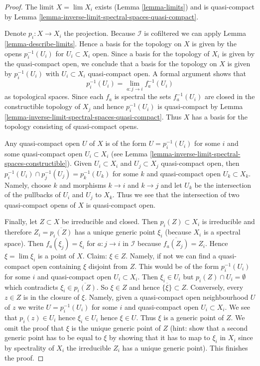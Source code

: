 \begin{proof}
The limit $X = \lim X_i$ exists (Lemma \ref{lemma-limits})
and is quasi-compact by
Lemma \ref{lemma-inverse-limit-spectral-spaces-quasi-compact}.

\medskip\noindent
Denote $p_i : X \to X_i$ the projection.
Because $\mathcal{I}$ is cofiltered we can apply
Lemma \ref{lemma-describe-limits}.
Hence a basis for the topology on $X$ is given by the opens
$p_i^{-1}(U_i)$ for $U_i \subset X_i$ open. Since a basis for
the topology of $X_i$ is given by the quasi-compact open, we conclude
that a basis for the topology on $X$ is given by $p_i^{-1}(U_i)$
with $U_i \subset X_i$ quasi-compact open. A formal argument
shows that
$$
p_i^{-1}(U_i) = \lim_{a : j \to i} f_a^{-1}(U_i)
$$
as topological spaces. Since each $f_a$ is spectral the sets
$f_a^{-1}(U_i)$ are closed in the constructible topology of $X_j$
and hence $p_i^{-1}(U_i)$ is quasi-compact
by Lemma \ref{lemma-inverse-limit-spectral-spaces-quasi-compact}.
Thus $X$ has a basis for the topology consisting of quasi-compact opens.

\medskip\noindent
Any quasi-compact open $U$ of $X$ is of the form $U = p_i^{-1}(U_i)$
for some $i$ and some quasi-compact open $U_i \subset X_i$
(see Lemma \ref{lemma-inverse-limit-spectral-spaces-constructible}).
Given $U_i \subset X_i$ and $U_j \subset X_j$ quasi-compact open, then
$p_i^{-1}(U_i) \cap p_j^{-1}(U_j) = p_k^{-1}(U_k)$ for some $k$
and quasi-compact open $U_k \subset X_k$. Namely, choose $k$
and morphisms $k \to i$ and $k \to j$ and let $U_k$ be the intersection of the
pullbacks of $U_i$ and $U_j$ to $X_k$. Thus we see that the intersection
of two quasi-compact opens of $X$ is quasi-compact open.

\medskip\noindent
Finally, let $Z \subset X$ be irreducible and closed. Then $p_i(Z) \subset X_i$
is irreducible and therefore $Z_i = \overline{p_i(Z)}$ has a unique generic
point $\xi_i$ (because $X_i$ is a spectral space). Then $f_a(\xi_j) = \xi_i$
for $a : j \to i$ in $\mathcal{I}$ because $\overline{f_a(Z_j)} = Z_i$.
Hence $\xi = \lim \xi_i$ is a point of $X$. Claim: $\xi \in Z$. Namely,
if not we can find a quasi-compact open containing $\xi$ disjoint
from $Z$. This would be of the form $p_i^{-1}(U_i)$ for some $i$ and
quasi-compact open $U_i \subset X_i$. Then $\xi_i \in U_i$ but
$p_i(Z) \cap U_i = \emptyset$ which contradicts $\xi_i \in \overline{p_i(Z)}$.
So $\xi \in Z$ and hence $\overline{\{\xi\}} \subset Z$. Conversely,
every $z \in Z$ is in the closure of $\xi$. Namely, given a quasi-compact
open neighbourhood $U$ of $z$ we write $U = p_i^{-1}(U_i)$ for some $i$
and quasi-compact open $U_i \subset X_i$. We see that $p_i(z) \in U_i$
hence $\xi_i \in U_i$ hence $\xi \in U$. Thus $\xi$ is a generic point
of $Z$. We omit the proof that $\xi$ is the unique generic point of $Z$
(hint: show that a second generic point has to be equal to $\xi$
by showing that it has to map to $\xi_i$ in $X_i$ since
by spectrality of $X_i$ the irreducible $Z_i$ has a unique generic point).
This finishes the proof.
\end{proof}

